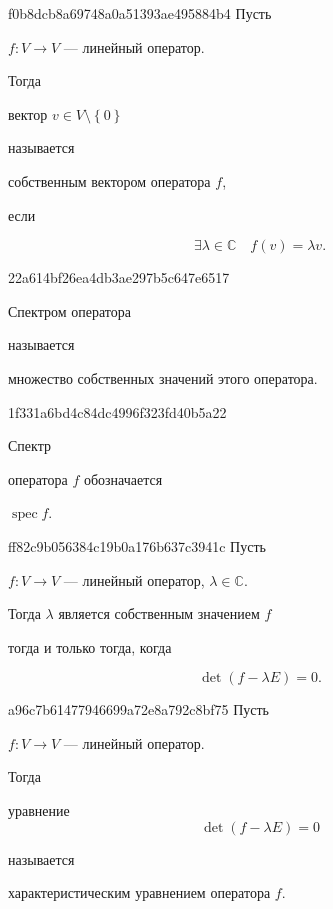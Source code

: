 \begin{note}{f0b8dcb8a69748a0a51393ae495884b4}
    Пусть \begin{icloze}{3}\( f : V \to V \) --- линейный оператор.\end{icloze} Тогда \begin{icloze}{1}вектор \( v \in V \setminus \left\{ 0 \right\} \)\end{icloze} называется \begin{icloze}{2}собственным вектором оператора \( f \),\end{icloze} если
    \begin{icloze}{1}
        \[
            \exists \lambda \in \mathbb C \quad f(v) = \lambda v.
        \]
    \end{icloze}
\end{note}

\begin{note}{22a614bf26ea4db3ae297b5c647e6517}
    \begin{icloze}{2}Спектром оператора\end{icloze} называется \begin{icloze}{1}множество собственных значений этого оператора.\end{icloze}
\end{note}

\begin{note}{1f331a6bd4c84dc4996f323fd40b5a22}
    \begin{icloze}{2}Спектр\end{icloze} оператора \( f \) обозначается \begin{icloze}{1}\( \operatorname{spec} f \).\end{icloze}
\end{note}

\begin{note}{ff82c9b056384c19b0a176b637c3941c}
    Пусть \begin{icloze}{3}\( f : V \to V \) --- линейный оператор,  \( \lambda \in \mathbb C  \).\end{icloze} Тогда \( \lambda \) является собственным значением \( f \) \begin{icloze}{2}тогда и только тогда, когда\end{icloze}
    \begin{icloze}{1}
        \[
            \det (f - \lambda E) = 0.
        \]
    \end{icloze}
\end{note}

\begin{note}{a96c7b61477946699a72e8a792c8bf75}
    Пусть \begin{icloze}{3}\( f : V \to V \) --- линейный оператор.\end{icloze} Тогда \begin{icloze}{2}уравнение
    \[
        \det (f - \lambda E) = 0
    \]
    \end{icloze} называется \begin{icloze}{1}характеристическим уравнением оператора \( f \).\end{icloze}
\end{note}

